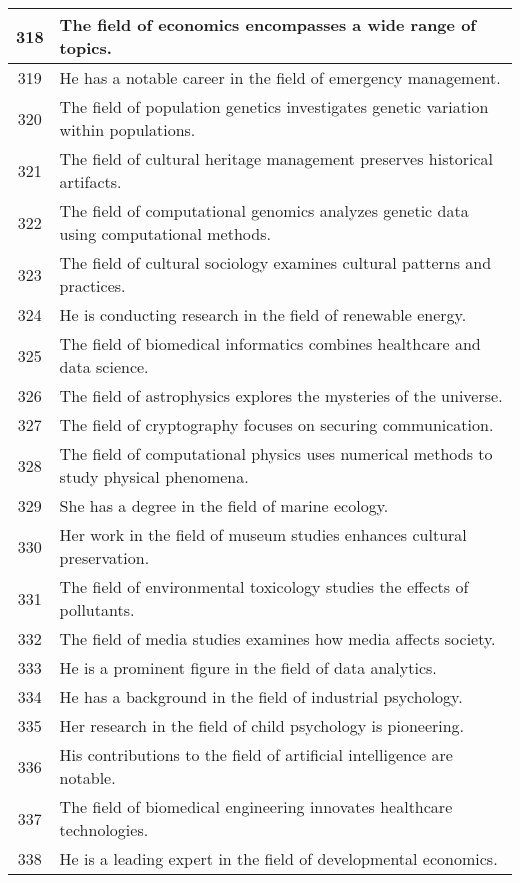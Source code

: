 \begin{longtable}{|c|p{12cm}|}
318 & The field of economics encompasses a wide range of topics. \\ \hline
319 & He has a notable career in the field of emergency management. \\ \hline
320 & The field of population genetics investigates genetic variation within populations. \\ \hline
321 & The field of cultural heritage management preserves historical artifacts. \\ \hline
322 & The field of computational genomics analyzes genetic data using computational methods. \\ \hline
323 & The field of cultural sociology examines cultural patterns and practices. \\ \hline
324 & He is conducting research in the field of renewable energy. \\ \hline
325 & The field of biomedical informatics combines healthcare and data science. \\ \hline
326 & The field of astrophysics explores the mysteries of the universe. \\ \hline
327 & The field of cryptography focuses on securing communication. \\ \hline
328 & The field of computational physics uses numerical methods to study physical phenomena. \\ \hline
329 & She has a degree in the field of marine ecology. \\ \hline
330 & Her work in the field of museum studies enhances cultural preservation. \\ \hline
331 & The field of environmental toxicology studies the effects of pollutants. \\ \hline
332 & The field of media studies examines how media affects society. \\ \hline
333 & He is a prominent figure in the field of data analytics. \\ \hline
334 & He has a background in the field of industrial psychology. \\ \hline
335 & Her research in the field of child psychology is pioneering. \\ \hline
336 & His contributions to the field of artificial intelligence are notable. \\ \hline
337 & The field of biomedical engineering innovates healthcare technologies. \\ \hline
338 & He is a leading expert in the field of developmental economics. \\ \hline

\end{longtable}
